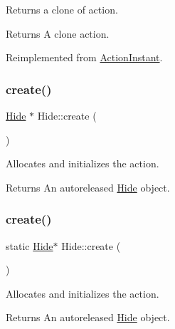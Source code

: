 Returns a clone of action.

\begin{DoxyReturn}{Returns}
A clone action. 
\end{DoxyReturn}


Reimplemented from \hyperlink{classActionInstant_adb76fc6f006098109e8256210cbd8cc0}{Action\+Instant}.

\mbox{\label{classHide_a5dad51d269e289a509714514d961f5c8}} 
\subsubsection{\texorpdfstring{create()}{create()}\hspace{0.1cm}{\footnotesize\ttfamily [1/2]}}
{\footnotesize\ttfamily \hyperlink{classHide}{Hide} $\ast$ Hide\+::create (\begin{DoxyParamCaption}{ }\end{DoxyParamCaption})\hspace{0.3cm}{\ttfamily [static]}}

Allocates and initializes the action.

\begin{DoxyReturn}{Returns}
An autoreleased \hyperlink{classHide}{Hide} object. 
\end{DoxyReturn}
\mbox{\label{classHide_a5171daa685905b25ec058019bf5f2cbc}} 
\subsubsection{\texorpdfstring{create()}{create()}\hspace{0.1cm}{\footnotesize\ttfamily [2/2]}}
{\footnotesize\ttfamily static \hyperlink{classHide}{Hide}$\ast$ Hide\+::create (\begin{DoxyParamCaption}{ }\end{DoxyParamCaption})\hspace{0.3cm}{\ttfamily [static]}}

Allocates and initializes the action.

\begin{DoxyReturn}{Returns}
An autoreleased \hyperlink{classHide}{Hide} object. 
\end{DoxyReturn}
\mbox{\label{classHide_add2d09abe89637c2e68e4196384a6dd9}} 
